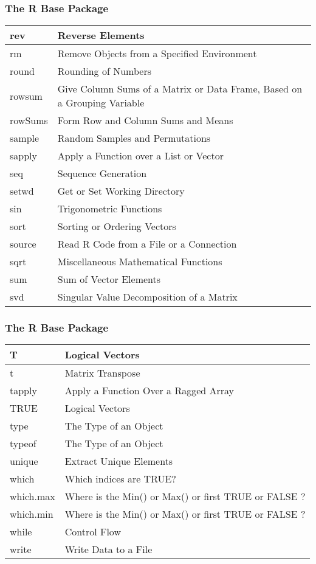 \documentclass{beamer}
\begin{document}
\begin{frame}
    \frametitle{The R Base Package} 

{\scriptsize
\begin{center}
\begin{tabular}{|l|l|}
 \hline
rev &	Reverse Elements \\ \hline
rm &	Remove Objects from a Specified Environment \\ \hline
round &	Rounding of Numbers \\ \hline
rowsum &	Give Column Sums of a Matrix or Data Frame, Based on a Grouping Variable \\ \hline
rowSums &	Form Row and Column Sums and Means \\ \hline
sample &	Random Samples and Permutations \\ \hline
sapply &	Apply a Function over a List or Vector \\ \hline
seq &	Sequence Generation \\ \hline
setwd &	Get or Set Working Directory \\ \hline
sin &	Trigonometric Functions \\ \hline
sort &	Sorting or Ordering Vectors \\ \hline
source &	Read R Code from a File or a Connection \\ \hline
sqrt &	Miscellaneous Mathematical Functions \\ \hline
sum &	Sum of Vector Elements \\ \hline
svd &	Singular Value Decomposition of a Matrix\\ \hline
\end{tabular}
\end{center}
}

\end{frame}

\begin{frame}
    \frametitle{The R Base Package} 

{\scriptsize
\begin{center}
\begin{tabular}{|l|l|}
 \hline
T  &	Logical Vectors  \\ \hline
t  &	Matrix Transpose  \\ \hline
tapply  &	Apply a Function Over a Ragged Array  \\ \hline
TRUE  &	Logical Vectors  \\ \hline
type  &	The Type of an Object  \\ \hline
typeof  &	The Type of an Object  \\ \hline
unique  &	Extract Unique Elements  \\ \hline
which  &	Which indices are TRUE?  \\ \hline
which.max  &	Where is the Min() or Max() or first TRUE or FALSE ?  \\ \hline
which.min  & Where is the Min() or Max() or first TRUE or FALSE ?  \\ \hline
while  &	Control Flow  \\ \hline
write & Write Data to a File  \\ \hline
\end{tabular}
\end{center}
}

\end{frame}
\end{document}
